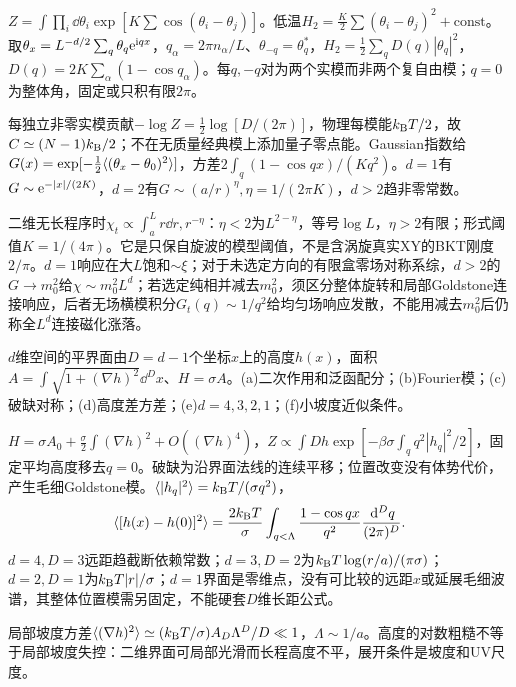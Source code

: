 \begin{solution}
$Z=\int\prod_i\dd\theta_i\exp[K\sum\cos(\theta_i-\theta_j)]$。低温$H_2=\tfrac K2\sum(\theta_i-\theta_j)^2+\mathrm{const}$。取$\theta_x=L^{-d/2}\sum_q\theta_q\mathrm e^{\mathrm i qx}$，$q_\alpha=2\pi n_\alpha/L$、$\theta_{-q}=\theta_q^*$，$H_2=\tfrac12\sum_qD(q)|\theta_q|^2$，$D(q)=2K\sum_\alpha(1-\cos q_\alpha)$。每$q,-q$对为两个实模而非两个复自由模；$q=0$为整体角，固定或只积有限$2\pi$。

每独立非零实模贡献$-\log Z=\tfrac12\log[D/(2\pi)]$，物理每模能$k_{\mathrm B} T/2$，故$C\simeq(N-1)k_{\mathrm B}/2$；不在无质量经典模上添加量子零点能。Gaussian指数给$G(x)=\exp[-\tfrac12\langle (\theta_x-\theta_0)^2\rangle]$，方差$2\int_q(1-\cos qx)/(Kq^2)$。$d=1$有$G\sim\mathrm e^{-|x|/(2K)}$，$d=2$有$G\sim(a/r)^\eta,\eta=1/(2\pi K)$，$d>2$趋非零常数。

二维无长程序时$\chi_t\propto\int_a^Lr\dd r,r^{-\eta}$：$\eta<2$为$L^{2-\eta}$，等号$\log L$，$\eta>2$有限；形式阈值$K=1/(4\pi)$。它是只保自旋波的模型阈值，不是含涡旋真实XY的BKT刚度$2/\pi$。$d=1$响应在大$L$饱和$\sim\xi$；对于未选定方向的有限盒零场对称系综，$d>2$的$G\to m_0^2$给$\chi\sim m_0^2L^d$；若选定纯相并减去$m_0^2$，须区分整体旋转和局部Goldstone连接响应，后者无场横模积分$G_t(q)\sim1/q^2$给均匀场响应发散，不能用减去$m_0^2$后仍称全$L^d$连接磁化涨落。
\end{solution}
\begin{exercise}[原题9(a)--(f)]\label{r:334-1-9}
$d$维空间的平界面由$D=d-1$个坐标$x$上的高度$h(x)$，面积$A=\int\sqrt{1+(\nabla h)^2}\dd^Dx$、$H=\sigma A$。(a)二次作用和泛函配分；(b)Fourier模；(c)破缺对称；(d)高度差方差；(e)$d=4,3,2,1$；(f)小坡度近似条件。
\end{exercise}
\begin{solution}
$H=\sigma A_0+\tfrac\sigma2\int(\nabla h)^2+O((\nabla h)^4)$，$Z\propto\int Dh\exp[-\beta\sigma\int_q q^2|h_q|^2/2]$，固定平均高度移去$q=0$。破缺为沿界面法线的连续平移；位置改变没有体势代价，产生毛细Goldstone模。$\langle |h_q|^2\rangle=k_{\mathrm B} T/(\sigma q^2)$，
\begin{equation}
\langle [h(x)-h(0)]^2\rangle=\frac{2k_{\mathrm B} T}{\sigma}\int_{q<\Lambda}\frac{1-\cos qx}{q^2}\frac{\,\mathrm d^Dq}{(2\pi)^D}.
\end{equation}
$d=4,D=3$远距趋截断依赖常数；$d=3,D=2$为$k_{\mathrm B} T\log(r/a)/(\pi\sigma)$；$d=2,D=1$为$k_{\mathrm B} T|r|/\sigma$；$d=1$界面是零维点，没有可比较的远距$x$或延展毛细波谱，其整体位置模需另固定，不能硬套$D$维长距公式。

局部坡度方差$\langle (\nabla h)^2\rangle\simeq(k_{\mathrm B} T/\sigma)A_D\Lambda^D/D\ll1$，$\Lambda\sim1/a$。高度的对数粗糙不等于局部坡度失控：二维界面可局部光滑而长程高度不平，展开条件是坡度和UV尺度。
\end{solution}
